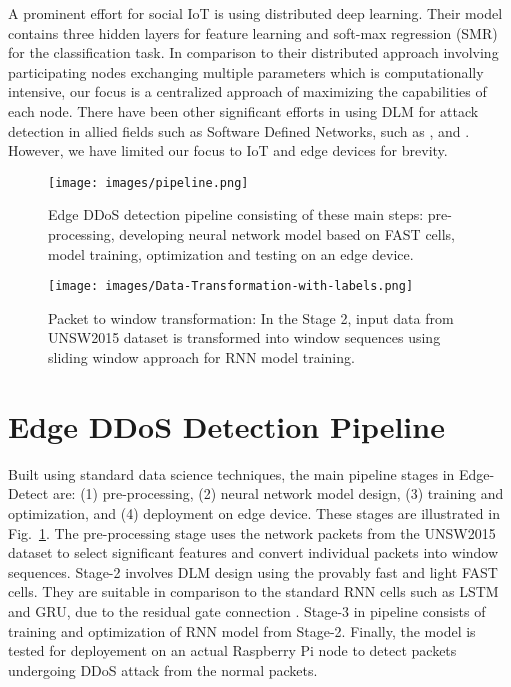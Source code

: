 \documentclass[conference]{IEEEtran}
\begin{document}
A prominent effort for social IoT \cite{diro2018distributed} is using distributed deep learning. Their model contains three hidden layers for feature learning and soft-max regression (SMR) for the classification task. 
In comparison to their distributed approach involving participating nodes exchanging multiple parameters which is computationally intensive, our focus is a centralized approach of maximizing the capabilities of each node. 
There have been other significant efforts in using DLM for attack detection in allied fields such as Software Defined Networks, such as \cite{niyaz2016deep}, \cite{li2018detection} and \cite{al2018deep}. However, we have limited our focus to IoT and edge devices for brevity. 


\begin{figure}
    \centering
    \texttt{[image: images/pipeline.png]}
\caption{Edge DDoS detection pipeline consisting of these main steps: pre-processing, developing neural network model based on FAST cells, model training, optimization and testing on an edge device.}
    \label{fig:pipleine}
\end{figure}
\begin{figure*}
   \centering
  \texttt{[image: images/Data-Transformation-with-labels.png]}
  \caption{Packet to window transformation: In the Stage 2, input data from UNSW2015 dataset is transformed into window sequences using sliding window approach for RNN model training.}
  \label{fig:data_transformation}
\end{figure*}


\section{Edge DDoS Detection Pipeline} \label{Sec:DLM}

\noindent Built using standard data science techniques, the main pipeline stages in Edge-Detect are: (1) pre-processing, (2) neural network model design, (3) training and optimization, and (4) deployment on edge device. These stages are illustrated in Fig.~\ref{fig:pipleine}. 
The pre-processing stage uses the network packets from the UNSW2015 dataset to select significant features and convert individual packets into window sequences. 
Stage-2 involves DLM design using the provably fast and light FAST cells. They are suitable in comparison to the standard RNN cells such as LSTM and GRU, due to the residual gate connection \cite{kusupati2018fastgrnn}. 
Stage-3 in pipeline consists of training and optimization of RNN model  from Stage-2. 
Finally, the model is tested for deployement on an actual Raspberry Pi node to detect packets undergoing DDoS attack from the normal packets. 
\end{document}
